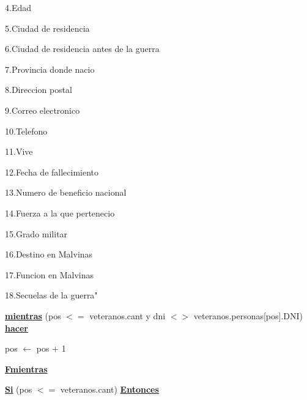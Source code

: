 \documentclass{article}
\begin{document}
                \hspace{25mm}4.Edad

                \hspace{25mm}5.Ciudad de residencia
                
                \hspace{25mm}6.Ciudad de residencia antes de la guerra

                \hspace{25mm}7.Provincia donde nacio

                \hspace{25mm}8.Direccion postal

                \hspace{25mm}9.Correo electronico

                \hspace{25mm}10.Telefono

                \hspace{25mm}11.Vive

                \hspace{25mm}12.Fecha de fallecimiento

                \hspace{25mm}13.Numero de beneficio nacional

                \hspace{25mm}14.Fuerza a la que pertenecio

                \hspace{25mm}15.Grado militar

                \hspace{25mm}16.Destino en Malvinas

                \hspace{25mm}17.Funcion en Malvinas

                \hspace{25mm}18.Secuelas de la guerra"

            \hspace{12mm}\underline{\textbf{mientras}} (pos $<=$ veteranos.cant y dni $<>$ veteranos.personas[pos].DNI) \underline{\textbf{hacer}}

                \hspace{16mm}pos $\leftarrow$ pos + 1

            \hspace{12mm}\underline{\textbf{Fmientras}}

            \hspace{12mm}\underline{\textbf{Si}} (pos $<=$ veteranos.cant) \underline{\textbf{Entonces}}
\end{document}
